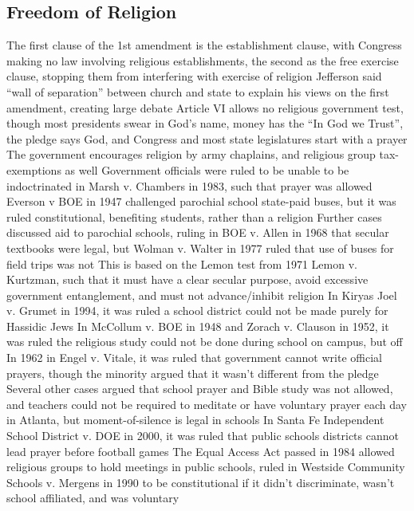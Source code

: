 \documentclass[11 pt, twoside]{article}
\newenvironment{outline*}
{
	\begin{outline}[enumerate]
	}
	{\end{outline}
}
\begin{document}
\subsection{Freedom of Religion}
\begin{outline*}
\1 The first clause of the 1st amendment is the establishment clause, with Congress making no law involving religious establishments, the second as the free exercise clause, stopping them from interfering with exercise of religion
\1 Jefferson said “wall of separation” between church and state to explain his views on the first amendment, creating large debate
\2 Article VI allows no religious government test, though most presidents swear in God’s name, money has the “In God we Trust”, the pledge says God, and Congress and most state legislatures start with a prayer
\2 The government encourages religion by army chaplains, and religious group tax-exemptions as well
\2 Government officials were ruled to be unable to be indoctrinated in Marsh v. Chambers in 1983, such that prayer was allowed
\1 Everson v BOE in 1947 challenged parochial school state-paid buses, but it was ruled constitutional, benefiting students, rather than a religion
\2 Further cases discussed aid to parochial schools, ruling in BOE v. Allen in 1968 that secular textbooks were legal, but Wolman v. Walter in 1977 ruled that use of buses for field trips was not
\2 This is based on the Lemon test from 1971 Lemon v. Kurtzman, such that it must have a clear secular purpose, avoid excessive government entanglement, and must not advance/inhibit religion
\2 In Kiryas Joel v. Grumet in 1994, it was ruled a school district could not be made purely for Hassidic Jews
\2 In McCollum v. BOE in 1948 and Zorach v. Clauson in 1952, it was ruled the religious study could not be done during school on campus, but off
\1 In 1962 in Engel v. Vitale, it was ruled that government cannot write official prayers, though the minority argued that it wasn’t different from the pledge
\2 Several other cases argued that school prayer and Bible study was not allowed, and teachers could not be required to meditate or have voluntary prayer each day in Atlanta, but moment-of-silence is legal in schools
\2 In Santa Fe Independent School District v. DOE in 2000, it was ruled that public schools districts cannot lead prayer before football games
\1 The Equal Access Act passed in 1984 allowed religious groups to hold meetings in public schools, ruled in Westside Community Schools v. Mergens in 1990 to be constitutional if it didn’t discriminate, wasn’t school affiliated, and was voluntary

\end{outline*}
\end{document}
